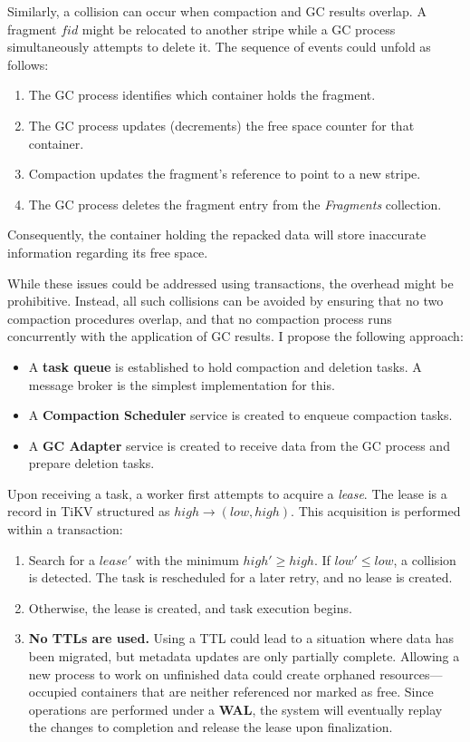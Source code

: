 \documentclass[a4paper,12pt]{article}
\begin{document}
    Similarly, a collision can occur when compaction and GC results overlap. A fragment $fid$ might be relocated to another stripe while a GC process simultaneously attempts to delete it. The sequence of events could unfold as follows:
    \begin{enumerate}
        \item The GC process identifies which container holds the fragment.
        \item The GC process updates (decrements) the free space counter for that container.
        \item Compaction updates the fragment's reference to point to a new stripe.
        \item The GC process deletes the fragment entry from the \textit{Fragments} collection.
    \end{enumerate}
    Consequently, the container holding the repacked data will store inaccurate information regarding its free space.

    While these issues could be addressed using transactions, the overhead might be prohibitive. Instead, all such collisions can be avoided by ensuring that no two compaction procedures overlap, and that no compaction process runs concurrently with the application of GC results. I propose the following approach:


    \begin{itemize}
        \item A \textbf{task queue} is established to hold compaction and deletion tasks. A message broker is the simplest implementation for this.
        \item A \textbf{Compaction Scheduler} service is created to enqueue compaction tasks.
        \item A \textbf{GC Adapter} service is created to receive data from the GC process and prepare deletion tasks.
    \end{itemize}

    Upon receiving a task, a worker first attempts to acquire a \textit{lease}. The lease is a record in TiKV structured as $high \rightarrow (low, high)$. This acquisition is performed within a transaction:

    \begin{enumerate}
        \item Search for a $lease'$ with the minimum $high' \geq high$. If $low' \leq low$, a collision is detected. The task is rescheduled for a later retry, and no lease is created.
        \item Otherwise, the lease is created, and task execution begins.
        \item \textbf{No TTLs are used.} Using a TTL could lead to a situation where data has been migrated, but metadata updates are only partially complete. Allowing a new process to work on unfinished data could create orphaned resources—occupied containers that are neither referenced nor marked as free. Since operations are performed under a \textbf{WAL}, the system will eventually replay the changes to completion and release the lease upon finalization.
    \end{enumerate}
\end{document}
